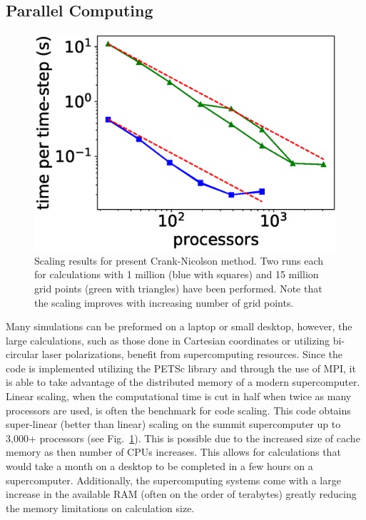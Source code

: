 \subsection{Parallel Computing} %
\label{sub:parallel_computing}
\begin{figure}[h!]
\centering
\includegraphics[width=0.5\columnwidth]{figs/Rydberg/multi_node.eps}
\caption{\label{fig:scaling} Scaling results for present Crank-Nicolson method. Two runs each for calculations with 1 million (blue with squares) and 15 million grid points (green with triangles) have been performed. Note that the scaling improves with increasing number of grid points.
}
\end{figure}
Many simulations can be preformed on a laptop or small desktop, however, the large calculations, such as those done in Cartesian coordinates or utilizing bi-circular laser polarizations, benefit from supercomputing resources. Since the code is implemented utilizing the PETSc library and through the use of MPI, it is able to take advantage of the distributed memory of a modern supercomputer. Linear scaling, when the computational time is cut in half when twice as many processors are used, is often the benchmark for code scaling. This code obtains super-linear (better than linear) scaling on the summit supercomputer up to 3,000+ processors (see Fig.~\ref{fig:scaling}). This is possible due to the increased size of cache memory as then number of CPUs increases. This allows for calculations that would take a month on a desktop to be completed in a few hours on a supercomputer. Additionally, the supercomputing systems come with a large increase in the available RAM (often on the order of terabytes) greatly reducing the memory limitations on calculation size.




